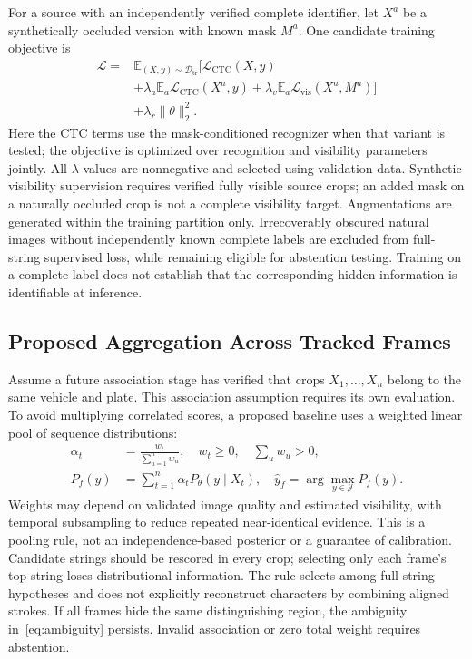 \documentclass[journal]{IEEEtran}
\newcommand{\E}{\mathbb{E}}
\newcommand{\calD}{\mathcal{D}}
\newcommand{\calY}{\mathcal{Y}}
\begin{document}
For a source with an independently verified complete identifier, let $X^a$ be a synthetically occluded version with known mask $M^a$. One candidate training objective is
\begin{equation}\label{eq:objective}
\begin{split}
 \mathcal{L}={}&\E_{(X,y)\sim\calD_{\mathrm{tr}}}
 \big[\mathcal{L}_{\mathrm{CTC}}(X,y)\\
 &+\lambda_a\E_{a}\mathcal{L}_{\mathrm{CTC}}(X^a,y)
 +\lambda_v\E_a\mathcal{L}_{\mathrm{vis}}(X^a,M^a)\big]\\
 &+\lambda_r\|\theta\|_2^2 .
\end{split}
\end{equation}
Here the CTC terms use the mask-conditioned recognizer when that variant is tested; the objective is optimized over recognition and visibility parameters jointly. All $\lambda$ values are nonnegative and selected using validation data. Synthetic visibility supervision requires verified fully visible source crops; an added mask on a naturally occluded crop is not a complete visibility target. Augmentations are generated within the training partition only. Irrecoverably obscured natural images without independently known complete labels are excluded from full-string supervised loss, while remaining eligible for abstention testing. Training on a complete label does not establish that the corresponding hidden information is identifiable at inference.

\subsection{Proposed Aggregation Across Tracked Frames}
Assume a future association stage has verified that crops $X_1,\ldots,X_n$ belong to the same vehicle and plate. This association assumption requires its own evaluation. To avoid multiplying correlated scores, a proposed baseline uses a weighted linear pool of sequence distributions:
\begin{align}
 \alpha_t&=\frac{w_t}{\sum_{u=1}^{n}w_u},\quad w_t\geq0,\quad\sum_uw_u>0,\label{eq:weights}\\
 P_f(y)&=\sum_{t=1}^{n}\alpha_t P_\theta(y\mid X_t),\quad
 \widehat y_f=\arg\max_{y\in\calY}P_f(y).\label{eq:fusion}
\end{align}
Weights may depend on validated image quality and estimated visibility, with temporal subsampling to reduce repeated near-identical evidence. This is a pooling rule, not an independence-based posterior or a guarantee of calibration. Candidate strings should be rescored in every crop; selecting only each frame's top string loses distributional information. The rule selects among full-string hypotheses and does not explicitly reconstruct characters by combining aligned strokes. If all frames hide the same distinguishing region, the ambiguity in~\eqref{eq:ambiguity} persists. Invalid association or zero total weight requires abstention.
\end{document}
